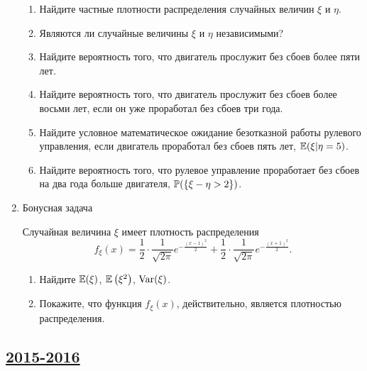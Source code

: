 \begin{enumerate}
\begin{enumerate}
  \item Найдите частные плотности распределения случайных величин $\xi$ и $\eta$.
  \item Являются ли случайные величины $\xi$ и $\eta$ независимыми?
  \item Найдите вероятность того, что двигатель прослужит без сбоев более пяти лет.
  \item Найдите вероятность того, что двигатель прослужит без сбоев более восьми лет,
  если он уже проработал без сбоев три года.
  \item Найдите условное математическое ожидание безотказной работы рулевого управления,
  если двигатель проработал без сбоев пять лет,  $\E(\xi | \eta = 5)$.
  \item Найдите вероятность того, что рулевое управление проработает без сбоев на
  два года больше двигателя, $\P(\{\xi - \eta > 2\})$.
\end{enumerate}

\item Бонусная задача

Случайная величина $\xi$ имеет плотность распределения
\[
f_{\xi}(x) = \frac{1}{2} \cdot \frac{1}{\sqrt{2\pi}}e^{-\frac{(x-1)^2}{2}} + \frac{1}{2} \cdot \frac{1}{\sqrt{2\pi}}e^{-\frac{(x+1)^2}{2}} \text{.}
\]

\begin{enumerate}
\item Найдите $\E(\xi)$, $\E\left(\xi^2\right)$, $\Var(\xi)$.
\item Покажите, что функция $f_{\xi}(x)$, действительно, является плотностью распределения.
\end{enumerate}
\end{enumerate}



\newpage
\subsection[2015-2016]{\hyperref[sec:sol_kr_02_2015_2016]{2015-2016}}
\label{sec:kr_02_2015_2016}

